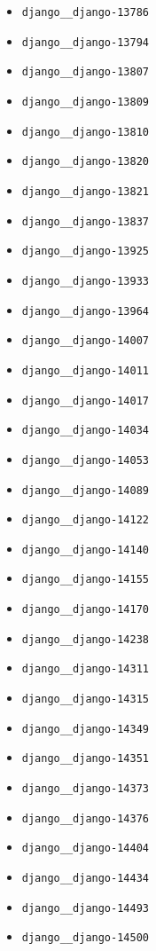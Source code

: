 \begin{multicols}{2}
\begin{itemize}
    \item \texttt{django\_\_django-13786}
    \item \texttt{django\_\_django-13794}
    \item \texttt{django\_\_django-13807}
    \item \texttt{django\_\_django-13809}
    \item \texttt{django\_\_django-13810}
    \item \texttt{django\_\_django-13820}
    \item \texttt{django\_\_django-13821}
    \item \texttt{django\_\_django-13837}
    \item \texttt{django\_\_django-13925}
    \item \texttt{django\_\_django-13933}
    \item \texttt{django\_\_django-13964}
    \item \texttt{django\_\_django-14007}
    \item \texttt{django\_\_django-14011}
    \item \texttt{django\_\_django-14017}
    \item \texttt{django\_\_django-14034}
    \item \texttt{django\_\_django-14053}
    \item \texttt{django\_\_django-14089}
    \item \texttt{django\_\_django-14122}
    \item \texttt{django\_\_django-14140}
    \item \texttt{django\_\_django-14155}
    \item \texttt{django\_\_django-14170}
    \item \texttt{django\_\_django-14238}
    \item \texttt{django\_\_django-14311}
    \item \texttt{django\_\_django-14315}
    \item \texttt{django\_\_django-14349}
    \item \texttt{django\_\_django-14351}
    \item \texttt{django\_\_django-14373}
    \item \texttt{django\_\_django-14376}
    \item \texttt{django\_\_django-14404}
    \item \texttt{django\_\_django-14434}
    \item \texttt{django\_\_django-14493}
    \item \texttt{django\_\_django-14500}

\end{itemize}
\end{multicols}
